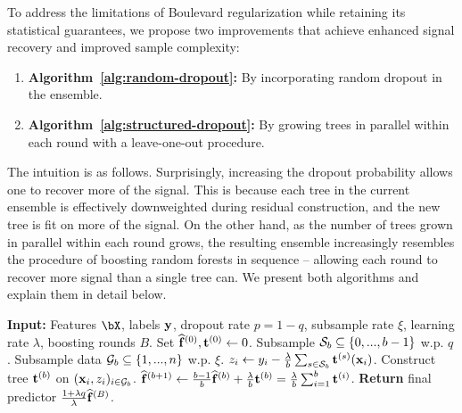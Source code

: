 To address the limitations of Boulevard regularization while retaining its statistical guarantees, we propose two improvements that achieve enhanced signal recovery and improved sample complexity:
\begin{enumerate}
    \item \textbf{Algorithm~\ref{alg:random-dropout}:} By incorporating random dropout \citep{rashmi2015dartdropoutsmeetmultiple} in the ensemble.
    \item \textbf{Algorithm~\ref{alg:structured-dropout}:} By growing trees in parallel within each round with a leave-one-out procedure.
\end{enumerate}
The intuition is as follows. Surprisingly, increasing the dropout probability allows one to recover more of the signal. This is because each tree in the current ensemble is effectively downweighted during residual construction, and the new tree is fit on more of the signal. On the other hand, as the number of trees grown in parallel within each round grows, the resulting ensemble increasingly resembles the procedure of boosting random forests in sequence -- allowing each round to recover more signal than a single tree can. We present both algorithms and explain them in detail below.

\vspace{-2ex}

\begin{algorithm}[H]
    \centering
    \caption{}
        \begin{algorithmic}[1]
        \STATE \textbf{Input:} Features $\bX$, labels $\mathbf{y}$, dropout rate $p = 1-q$, subsample rate $\xi$, learning rate $\lambda$, boosting rounds $B$. Set $\widehat{\mathbf{f}}^{(0)}, \mathbf{t}^{(0)} \gets 0$. 
        \STATE Subsample ${\mathcal{S}}_b \subseteq \{0,...,b-1\}$ w.p. $q$.
        \STATE Subsample data ${\mathcal{G}}_b \subseteq \{1,...,n\}$ w.p. $ \xi$.
        \STATE
        $z_i \gets y_i - \frac{\lambda}{b}\sum_{s \in {\mathcal{S}}_b}\mathbf{t}^{(s)}(\mathbf{x}_i)$.
        \STATE Construct tree $\mathbf{t}^{(b)}$ on $(\mathbf{x}_i, z_i)_{i \in {\mathcal{G}}_b}$.
        \STATE $\widehat{\mathbf{f}}^{(b+1)} \gets \frac{b-1}{b}\widehat{\mathbf{f}}^{(b)} + \frac{\lambda}{b}\mathbf{t}^{(b)} = \frac{\lambda}{b}\sum_{i=1}^b \mathbf{t}^{(i)}$.
        \ENDFOR
        \STATE \textbf{Return} final predictor $\frac{1+\lambda q}{\lambda} \widehat{\mathbf{f}}^{(B)}$.
    \end{algorithmic}
    \label{alg:random-dropout}
\end{algorithm}

